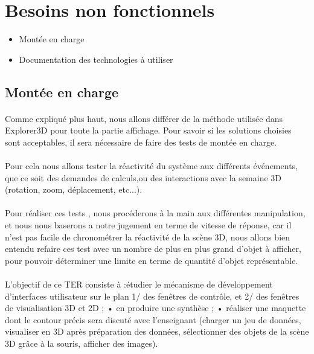 \section{Besoins non fonctionnels}
\begin{itemize}
\item Montée en charge
\item Documentation des technologies à utiliser
\end{itemize}
\subsection{Montée en charge}
\paragraph{} Comme expliqué plus haut, nous allons différer de la méthode utilisée dans Explorer3D pour toute la partie affichage. Pour savoir si les solutions choisies sont acceptables, il sera nécessaire de faire des tests de montée en charge.

\paragraph{} Pour cela nous allons tester la réactivité du système aux différents événements, que ce soit des demandes de calculs,ou des interactions avec la semaine 3D (rotation, zoom, déplacement, etc...).

\paragraph{} Pour réaliser ces tests , nous procéderons à la main aux différentes manipulation, et nous nous baserons a notre jugement en terme de vitesse de réponse, car il n'est pas facile de chronométrer la réactivité de la scène 3D, nous allons bien entendu refaire ces test avec un nombre de plus en plus grand d'objet à afficher, pour pouvoir déterminer une limite en terme de quantité d'objet représentable.

\paragraph{}
L'objectif de ce TER consiste à :étudier le mécanisme de développement d'interfaces utilisateur sur le plan 1/ des fenêtres de
contrôle, et 2/ des fenêtres de visualisation 3D et 2D ;
• en produire une synthèse ;
• réaliser une maquette dont le contour précis sera discuté avec l'enseignant (charger un jeu de
données, visualiser en 3D après préparation des données, sélectionner des objets de la scène
3D grâce à la souris, afficher des images).
\newpage

